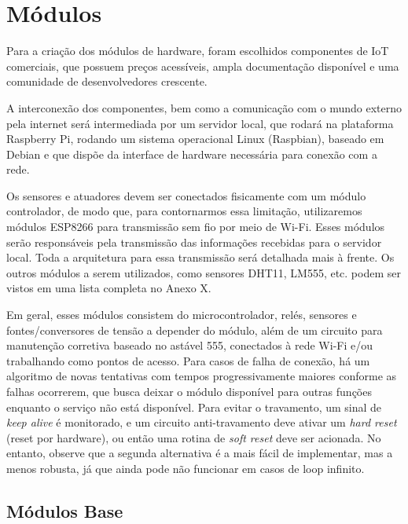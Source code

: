 \section{Módulos}
Para a criação dos módulos de hardware, foram escolhidos componentes de IoT comerciais, que possuem preços acessíveis, ampla documentação disponível e uma comunidade de desenvolvedores crescente.

A interconexão dos componentes, bem como a comunicação com o mundo externo pela internet será intermediada por um servidor local, que rodará na plataforma Raspberry Pi, rodando um sistema operacional Linux (Raspbian), baseado em Debian e que dispõe da interface de hardware necessária para conexão com a rede.

Os sensores e atuadores devem ser conectados fisicamente com um módulo controlador, de modo que, para contornarmos essa limitação, utilizaremos módulos ESP8266 para transmissão sem fio por meio de Wi-Fi. Esses módulos serão responsáveis pela transmissão das informações recebidas para o servidor local. Toda a arquitetura para essa transmissão será detalhada mais à frente. Os outros módulos a serem utilizados, como sensores DHT11, LM555, etc. podem ser vistos em uma lista completa no Anexo X. %

Em geral, esses módulos consistem do microcontrolador, relés, sensores e fontes/conversores de tensão a depender do módulo, além de um circuito para manutenção corretiva baseado no astável 555, conectados à rede Wi-Fi e/ou trabalhando como pontos de acesso. Para casos de falha de conexão, há um algoritmo de novas tentativas com tempos progressivamente maiores conforme as falhas ocorrerem, que busca deixar o módulo disponível para outras funções enquanto o serviço não está disponível. Para evitar o travamento, um sinal de \textit{keep alive} é monitorado, e um circuito anti-travamento deve ativar um \textit{hard reset} (reset por hardware), ou então uma rotina de \textit{soft reset} deve ser acionada. No entanto, observe que a segunda alternativa é a mais fácil de implementar, mas a menos robusta, já que ainda pode não funcionar em casos de loop infinito.

\subsection{Módulos Base}
